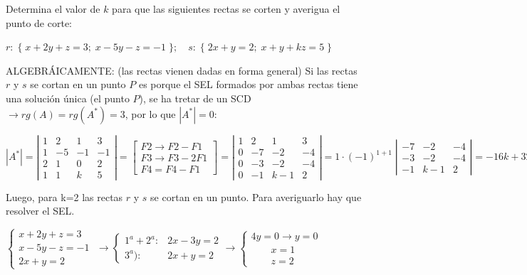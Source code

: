 \begin{ejre}
Determina el valor de $k$ para que las siguientes rectas se corten y averigua el punto de corte:

\noindent $r:\;\{\;x+2y+z=3;\;x-5y-z=-1\;\};\quad s:\;\{\;2x+y=2;\; x+y+kz=5\;\}$	
\end{ejre}

\begin{proofw}\renewcommand{\qedsymbol}{$\diamond$}
ALGEBRÁICAMENTE:  (las rectas vienen dadas en forma general) Si las rectas $r$ y $s$ se cortan en un punto $P$ es porque el SEL formados por ambas rectas tiene una solución única (el punto $P$), se ha tretar de un SCD $\to rg(A)=rg(A^*)=3$, por lo que $|A^*|=0$:

\noindent $|A^*|=\left| \begin{matrix} 1&2&1&3	\\1&-5&-1&-1\\2&1&0&2\\1&1&k&5  \end{matrix} \right| =\left[ \begin{matrix} F2\to F2-F1\\ F3\to F3-2F1\\ F4=F4-F1 \end{matrix} \right] = \left| \begin{matrix} 1&2&1&3\\ 0&-7&-2&-4 \\0&-3&-2&-4\\0&-1&k-1&2	  \end{matrix} \right| = 1 \cdot (-1)^{1+1}\; \left| \begin{matrix} -7&-2&-4\\-3&-2&-4\\-1&k-1&2 \end{matrix} \right|=-16k+32 = 0 \leftrightarrow k=2$

\noindent Luego, para k=2 las rectas $r$ y $s$ se cortan en un punto. Para averiguarlo hay que resolver el SEL.

\noindent $\begin{cases} x+2y+z=3\\x-5y-z=-1\;\\2x+y=2 \end{cases} \to \begin{cases}  1^a + 2^a: & 2x-3y=2 \\ 3^a): & 2x+y=2 \end{cases} \to \begin{cases} 4y=0\to y=0\\ \qquad x=1\\ \qquad z=2 \end{cases}$


\end{proofw}
